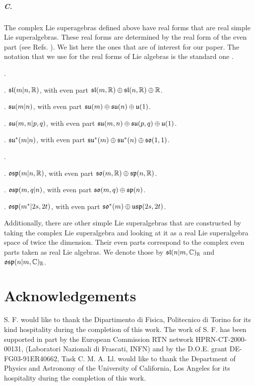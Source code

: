 \documentclass[a4paper,12pt]{article}
\begin{document}
\subparagraph{C.} The complex Lie superagebras defined above have
real forms that are real simple Lie superalgebras. These real
forms are determined by the real form of the even part (see Refs.
\cite{vp,dflv,dfl}). We list here the ones that are of interest
for our paper. The notation that we use for the real forms of Lie
algebras is the standard one \cite{he}.

\bigskip

.

\medskip

. $\mathfrak{sl}(m|n,\mathbb{R})$, with even part
$\mathfrak{sl}(m,\mathbb{R})\oplus\mathfrak{sl}(n,\mathbb{R})\oplus \mathbb{R}$.

. $\mathfrak{su}(m|n)$, with even part
$\mathfrak{su}(m)\oplus\mathfrak{su}(n)\oplus \mathfrak{u}(1)$.

. $\mathfrak{su}(m,n|p,q)$, with even part
$\mathfrak{su}(m,n)\oplus\mathfrak{su}(p,q)\oplus \mathfrak{u}(1) $.

. $\mathfrak{su}^*(m|n)$, with even part
$\mathfrak{su}^*(m)\oplus\mathfrak{su}^*(n)\oplus \mathfrak{so}(1,1)$.

\bigskip

.

\medskip

. $\mathfrak{osp}(m|n,\mathbb{R})$, with even part
$\mathfrak{so}(m,\mathbb{R})\oplus\mathfrak{sp}(n,\mathbb{R})$.

. $\mathfrak{osp}(m,q|n)$, with even part
$\mathfrak{so}(m,q)\oplus\mathfrak{sp}(n)$.

. $\mathfrak{osp}(m^*|2s,2t)$, with even part
$\mathfrak{so}^*(m)\oplus\mathfrak{usp}(2s,2t)$.

\bigskip

Additionally, there are other simple Lie superalgebras that are
constructed by taking the complex Lie superalgebra and looking at
it as a real Lie superalgebra space of twice the dimension. Their
even parts correspond to the complex even parts taken as real Lie
algebras. We denote those by $\mathfrak{sl}(n|m,\mathbb{C})_{\mathbb{R}}$ and
$\mathfrak{osp}(n|m,\mathbb{C})_{\mathbb{R}}$.








\section*{Acknowledgements}

S. F. would like to thank the Dipartimento di Fisica, Politecnico
di Torino for its kind hospitality during the completion of this
work. The work of S. F. has been supported in part by the European
Commission RTN network HPRN-CT-2000-00131, (Laboratori Nazionali
di Frascati, INFN) and by the D.O.E. grant DE-FG03-91ER40662, Task
C. M. A. Ll. would like to thank the Department of Physics and
Astronomy of the University of California, Los Angeles for its
hospitality during the completion of this work.
\end{document}
